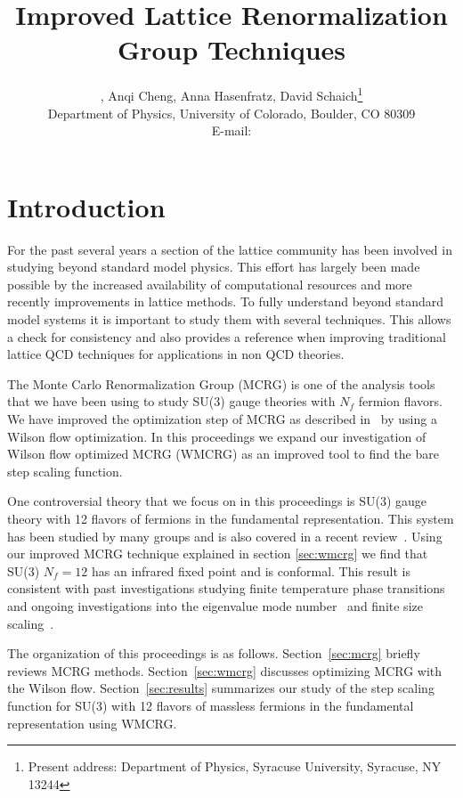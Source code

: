 \documentclass{PoS}
\title{Improved Lattice Renormalization Group Techniques}
\author{\speaker{Gregory Petropoulos}, Anqi Cheng, Anna Hasenfratz, David Schaich\footnote{Present address: Department of Physics, Syracuse University, Syracuse, NY 13244} \\
        Department of Physics, University of Colorado, Boulder, CO 80309 \\
        E-mail: \email{gregory.petropoulos@colorado.edu}}
\newcommand{\secref}[1]{Section~\ref{#1}}
\begin{document}
\section{Introduction} %
For the past several years a section of the lattice community has been involved in studying beyond standard model physics.
This effort has largely been made possible by the increased availability of computational resources and more recently improvements in lattice methods.
To fully understand beyond standard model systems it is important to study them with several techniques.
This allows a check for consistency and also provides a reference when improving traditional lattice QCD techniques for applications in non QCD theories.

The Monte Carlo Renormalization Group (MCRG) is one of the analysis tools that we have been using to study SU(3) gauge theories with $N_f$ fermion flavors.
We have improved the optimization step of MCRG as described in~\cite{Petropoulos:2012mg} by using a Wilson flow optimization.
In this proceedings we expand our investigation of Wilson flow optimized MCRG (WMCRG) as an improved tool to find the bare step scaling function.

One controversial theory that we focus on in this proceedings is SU(3) gauge theory with 12 flavors of fermions in the fundamental representation.
This system has been studied by many groups \cite{Appelquist:2009ty, Deuzeman:2009mh, Fodor:2011tu, Hasenfratz:2011xn, DeGrand:2011cu, Cheng:2011ic, Fodor:2012uw, Fodor:2012et, Appelquist:2011dp, Aoki:2012eq, Aoki:2013pca, Itou:2012qn, Lin:2012iw, Jin:2012dw, Cheng:2013eu, Hasenfratz:2013uha, Hasenfratz:2013eka} and is also covered in a recent review~\cite{Giedt:2012LAT}.
Using our improved MCRG technique explained in section \ref{sec:wmcrg} we find that SU(3) $N_f = 12$ has an infrared fixed point and is conformal.
This result is consistent with past investigations studying finite temperature phase transitions~\cite{Schaich:2012fr, Hasenfratz:2013uha} and ongoing investigations into the eigenvalue mode number~\cite{Cheng:2013eu} and finite size scaling~\cite{Hasenfratz:2013eka}.

The organization of this proceedings is as follows.
\secref{sec:mcrg} briefly reviews MCRG methods.
\secref{sec:wmcrg} discusses optimizing MCRG with the Wilson flow.
\secref{sec:results} summarizes our study of the step scaling function for SU(3) with 12 flavors of massless fermions in the fundamental representation using WMCRG.
\end{document}
